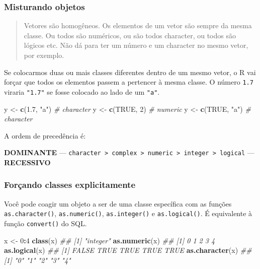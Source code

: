 \documentclass[
]{book}
\newenvironment{Shaded}{\begin{snugshade}}{\end{snugshade}}
\newcommand{\CommentTok}[1]{\textcolor[rgb]{0.56,0.35,0.01}{\textit{#1}}}
\newcommand{\DecValTok}[1]{\textcolor[rgb]{0.00,0.00,0.81}{#1}}
\newcommand{\FloatTok}[1]{\textcolor[rgb]{0.00,0.00,0.81}{#1}}
\newcommand{\KeywordTok}[1]{\textcolor[rgb]{0.13,0.29,0.53}{\textbf{#1}}}
\newcommand{\NormalTok}[1]{#1}
\newcommand{\OperatorTok}[1]{\textcolor[rgb]{0.81,0.36,0.00}{\textbf{#1}}}
\newcommand{\OtherTok}[1]{\textcolor[rgb]{0.56,0.35,0.01}{#1}}
\newcommand{\StringTok}[1]{\textcolor[rgb]{0.31,0.60,0.02}{#1}}
\begin{document}
\hypertarget{misturando-objetos}{%
\subsubsection{Misturando objetos}\label{misturando-objetos}}

\begin{quote}
Vetores são homogêneos. Os elementos de um vetor são sempre da mesma classe. Ou todos são numéricos, ou são todos character, ou todos são lógicos etc. Não dá para ter um número e um character no mesmo vetor, por exemplo.
\end{quote}

Se colocarmos duas ou mais classes diferentes dentro de um mesmo vetor, o R vai forçar que todos os elementos passem a pertencer à mesma classe. O número \texttt{1.7} viraria \texttt{"1.7"} se fosse colocado ao lado de um \texttt{"a"}.

\begin{Shaded}
\begin{Highlighting}[]
\NormalTok{y <-}\StringTok{ }\KeywordTok{c}\NormalTok{(}\FloatTok{1.7}\NormalTok{, }\StringTok{"a"}\NormalTok{)  }\CommentTok{# character}
\NormalTok{y <-}\StringTok{ }\KeywordTok{c}\NormalTok{(}\OtherTok{TRUE}\NormalTok{, }\DecValTok{2}\NormalTok{)   }\CommentTok{# numeric}
\NormalTok{y <-}\StringTok{ }\KeywordTok{c}\NormalTok{(}\OtherTok{TRUE}\NormalTok{, }\StringTok{"a"}\NormalTok{) }\CommentTok{# character}
\end{Highlighting}
\end{Shaded}

A ordem de precedência é:

\textbf{DOMINANTE} --- \texttt{character\ \textgreater{}\ complex\ \textgreater{}\ numeric\ \textgreater{}\ integer\ \textgreater{}\ logical} --- \textbf{RECESSIVO}

\hypertarget{foruxe7ando-classes-explicitamente}{%
\subsubsection{Forçando classes explicitamente}\label{foruxe7ando-classes-explicitamente}}

Você pode coagir um objeto a ser de uma classe específica com as funções \texttt{as.character()}, \texttt{as.numeric()}, \texttt{as.integer()} e \texttt{as.logical()}. É equivalente à função \texttt{convert()} do SQL.

\begin{Shaded}
\begin{Highlighting}[]
\NormalTok{x <-}\StringTok{ }\DecValTok{0}\OperatorTok{:}\DecValTok{4}
\KeywordTok{class}\NormalTok{(x)}
\CommentTok{## [1] "integer"}
\KeywordTok{as.numeric}\NormalTok{(x)}
\CommentTok{## [1] 0 1 2 3 4}
\KeywordTok{as.logical}\NormalTok{(x)}
\CommentTok{## [1] FALSE  TRUE  TRUE  TRUE  TRUE}
\KeywordTok{as.character}\NormalTok{(x)}
\CommentTok{## [1] "0" "1" "2" "3" "4"}
\end{Highlighting}
\end{Shaded}
\end{document}
